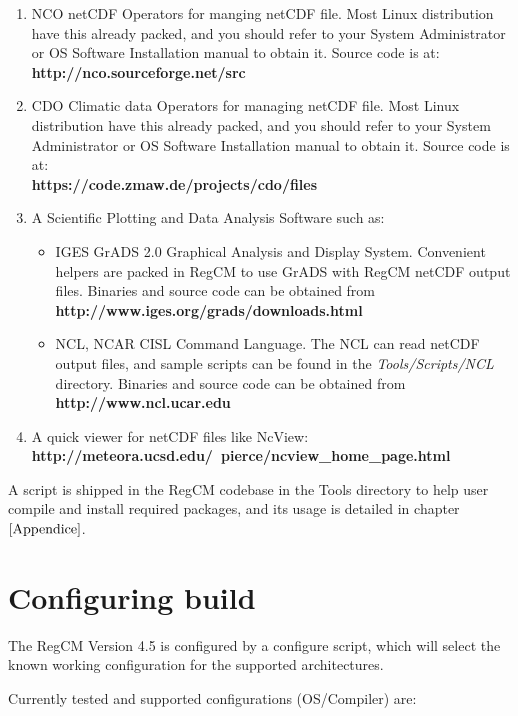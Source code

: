 \begin{enumerate}
\item NCO netCDF Operators for manging netCDF file. Most Linux distribution
have this already packed, and you should refer to your System Administrator or
OS Software Installation manual to obtain it. Source code is at: \\
{\bf http://nco.sourceforge.net/src}
\item CDO Climatic data Operators for managing netCDF file. Most Linux
distribution have this already packed, and you should refer to your System
Administrator or OS Software Installation manual to obtain it.
Source code is at: \\
{\bf https://code.zmaw.de/projects/cdo/files}
\item A Scientific Plotting and Data Analysis Software such as:
\begin{itemize}
\item IGES GrADS 2.0 Graphical Analysis and Display System. Convenient helpers
are packed in RegCM to use GrADS with RegCM netCDF output files.
Binaries and source code can be obtained from \\
{\bf http://www.iges.org/grads/downloads.html}
\item NCL, NCAR CISL Command Language. The NCL can read netCDF output files, and
sample scripts can be found in the {\em Tools/Scripts/NCL} directory.
Binaries and source code can be obtained from \\
{\bf http://www.ncl.ucar.edu}
\end{itemize}
\item A quick viewer for netCDF files like NcView: \\
{\bf http://meteora.ucsd.edu/~pierce/ncview\_home\_page.html}
\end{enumerate}

A script is shipped in the RegCM codebase in the Tools directory to help
user compile and install required packages, and its usage is detailed in
chapter $\ref{Appendice}$.

\section{Configuring build}

The RegCM Version 4.5 is configured by a configure script, which will select
the known working configuration for the supported architectures.

Currently tested and supported configurations (OS/Compiler) are:

